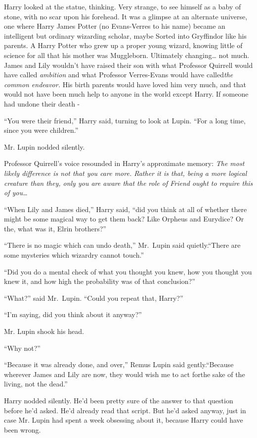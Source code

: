 Harry looked at the statue, thinking. Very strange, to see himself as a baby of stone, with no scar upon his forehead. It was a glimpse at an alternate universe, one where Harry James Potter (no Evans-Verres to his name) became an intelligent but ordinary wizarding scholar, maybe Sorted into Gryffindor like his parents. A Harry Potter who grew up a proper young wizard, knowing little of science for all that his mother was Muggleborn. Ultimately changing\ldots{} not much. James and Lily wouldn't have raised their son with what Professor Quirrell would have called \emph{ambition} and what Professor Verres-Evans would have called\emph{the common endeavor.} His birth parents would have loved him very much, and that would not have been much help to anyone in the world except Harry. If someone had undone their death -

``You were their friend,'' Harry said, turning to look at Lupin. ``For a long time, since you were children.''

Mr. Lupin nodded silently.

Professor Quirrell's voice resounded in Harry's approximate memory: \emph{The most likely difference is not that you care more. Rather it is that, being a more logical creature than they, only you are aware that the role of Friend ought to require this of you\ldots{}}

``When Lily and James died,'' Harry said, ``did you think at all of whether there might be some magical way to get them back? Like Orpheus and Eurydice? Or the, what was it, Elrin brothers?''

``There is no magic which can undo death,'' Mr.~Lupin said quietly.``There are some mysteries which wizardry cannot touch.''

``Did you do a mental check of what you thought you knew, how you thought you knew it, and how high the probability was of that conclusion?''

``What?'' said Mr.~Lupin. ``Could you repeat that, Harry?''

``I'm saying, did you think about it anyway?''

Mr. Lupin shook his head.

``Why not?''

``Because it was already done, and over,'' Remus Lupin said gently.``Because wherever James and Lily are now, they would wish me to act forthe sake of the living, not the dead.''

Harry nodded silently. He'd been pretty sure of the answer to that question before he'd asked. He'd already read that script. But he'd asked anyway, just in case Mr. Lupin had spent a week obsessing about it, because Harry could have been wrong.

